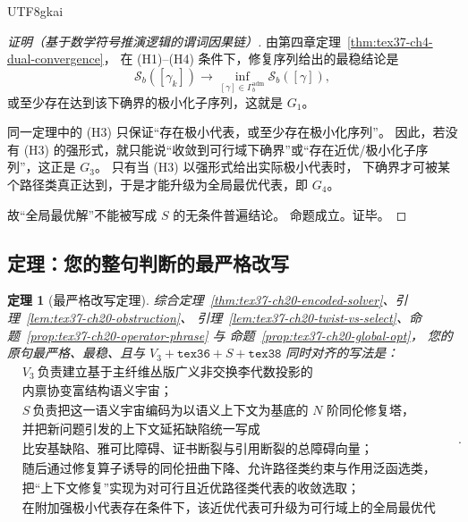 \documentclass[12pt]{article}
\newtheorem{theorem}{定理}[section]
\begin{document}
\begin{CJK*}{UTF8}{gkai}
\begin{proof}[证明（基于数学符号推演逻辑的谓词因果链）]
由第四章定理~\ref{thm:tex37-ch4-dual-convergence}，
在 \textnormal{(H1)}--\textnormal{(H4)} 条件下，修复序列给出的最稳结论是
\[
  \mathcal S_b([\gamma_k])
  \to
  \inf_{[\gamma]\in\Gamma_b^{\mathrm{adm}}}\mathcal S_b([\gamma]),
\]
或至少存在达到该下确界的极小化子序列，这就是 $G_1$。

同一定理中的 \textnormal{(H3)} 只保证“存在极小代表，或至少存在极小化序列”。
因此，若没有 \textnormal{(H3)} 的强形式，就只能说“收敛到可行域下确界”或“存在近优/极小化子序列”，这正是 $G_3$。
只有当 \textnormal{(H3)} 以强形式给出实际极小代表时，
下确界才可被某个路径类真正达到，于是才能升级为全局最优代表，即 $G_4$。

故“全局最优解”不能被写成 $S$ 的无条件普遍结论。
命题成立。证毕。
\end{proof}

\subsection{定理：您的整句判断的最严格改写}
\label{subsec:tex37-ch20-final}

\begin{theorem}[最严格改写定理]
\label{thm:tex37-ch20-final}
综合定理~\ref{thm:tex37-ch20-encoded-solver}、引理~\ref{lem:tex37-ch20-obstruction}、
引理~\ref{lem:tex37-ch20-twist-vs-select}、命题~\ref{prop:tex37-ch20-operator-phrase} 与
命题~\ref{prop:tex37-ch20-global-opt}，
您的原句最严格、最稳、且与 $V_3+\texttt{tex36}+S+\texttt{tex38}$ 同时对齐的写法是：
\[
  \boxed{
    \begin{aligned}
      &V_3\ \text{负责建立基于主纤维丛版广义非交换李代数投影的}\\
      &\text{内禀协变富结构语义宇宙；}\\
      &S\ \text{负责把这一语义宇宙编码为以语义上下文为基底的 }N\text{ 阶同伦修复塔，}\\
      &\text{并把新问题引发的上下文延拓缺陷统一写成}\\
      &\text{比安基缺陷、雅可比障碍、证书断裂与引用断裂的总障碍向量；}\\
      &\text{随后通过修复算子诱导的同伦扭曲下降、允许路径类约束与作用泛函选类，}\\
      &\text{把“上下文修复”实现为对可行且近优路径类代表的收敛选取；}\\
      &\text{在附加强极小代表存在条件下，该近优代表可升级为可行域上的全局最优代表。}
    \end{aligned}
  }.
\]
\end{theorem}


\end{CJK*}
\end{document}
